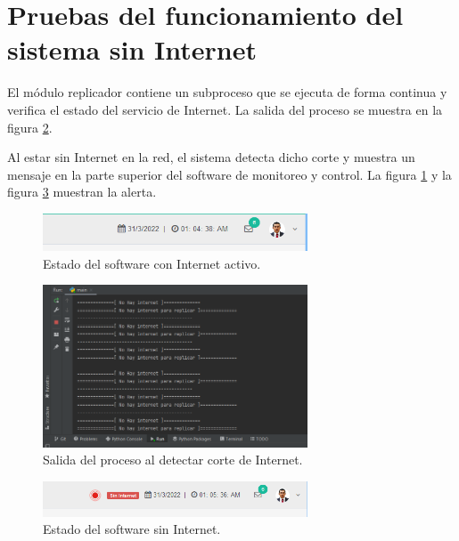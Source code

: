 \section{Pruebas del funcionamiento del sistema sin Internet}

El módulo replicador contiene un subproceso que se ejecuta de forma continua y verifica el estado del servicio de Internet. La salida del proceso se muestra en la figura \ref{fig:inter1}. 

Al estar sin Internet en la red, el sistema detecta dicho corte y muestra un mensaje en la parte superior del software de monitoreo y control. La figura \ref{fig:inter2} y la figura \ref{fig:inter3} muestran la alerta.
\begin{figure}[htpb]
\centering 
\includegraphics[width=0.7\textwidth]{./Figures/test/replicador/desconexion1.png}
\caption{Estado del software con Internet activo.}
\label{fig:inter2}
\end{figure}
\begin{figure}[htpb]
\centering 
\includegraphics[width=0.7\textwidth]{./Figures/test/replicador/desconexion3.png}
\caption{Salida del proceso al detectar corte de Internet.}
\label{fig:inter1}
\end{figure}
\vspace{1.0cm}
\begin{figure}[htpb]
\centering 
\includegraphics[width=0.7\textwidth]{./Figures/test/replicador/desconexion2.png}
\caption{Estado del software sin Internet.}
\label{fig:inter3}
\end{figure}


